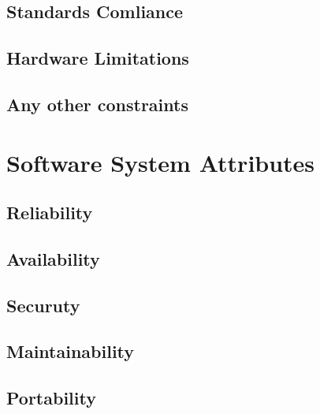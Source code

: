 \subsection{Standards Comliance}
\subsection{Hardware Limitations}
\subsection{Any other constraints}

\section{Software System Attributes}
\subsection{Reliability}
\subsection{Availability}
\subsection{Securuty}
\subsection{Maintainability}
\subsection{Portability}